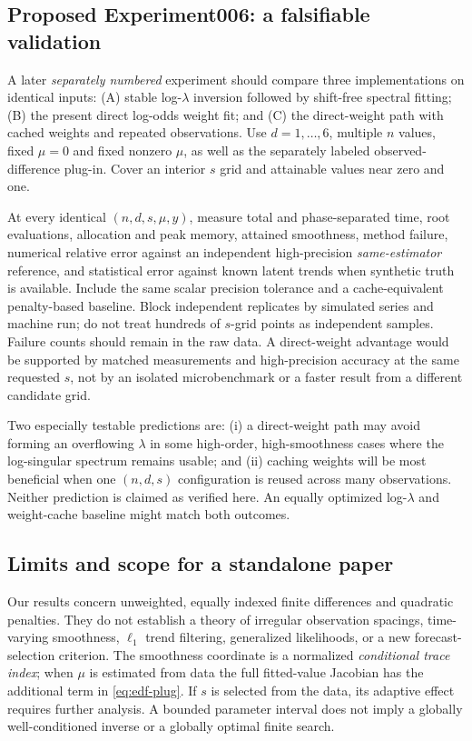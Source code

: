 \subsection{Proposed Experiment006: a falsifiable validation}
A later \emph{separately numbered} experiment should
compare three implementations on identical inputs:
(A) stable log-$\lambda$ inversion followed by
shift-free spectral fitting; (B) the present direct
log-odds weight fit; and (C) the direct-weight path
with cached weights and repeated observations.
Use $d=1,\ldots,6$, multiple $n$ values,
fixed $\mu=0$ and fixed nonzero $\mu$, as well
as the separately labeled observed-difference
plug-in. Cover an interior $s$ grid and attainable
values near zero and one.

At every identical $(n,d,s,\mu,y)$,
measure total and phase-separated time, root
evaluations, allocation and peak memory,
attained smoothness, method failure, numerical
relative error against an independent
high-precision \emph{same-estimator} reference,
and statistical error against known latent trends
when synthetic truth is available. Include the
same scalar precision tolerance and a
cache-equivalent penalty-based baseline.
Block independent replicates by simulated
series and machine run; do not treat hundreds
of $s$-grid points as independent samples.
Failure counts should remain in the raw data.
A direct-weight advantage would be supported by
matched measurements and high-precision accuracy
at the same requested $s$, not by an isolated
microbenchmark or a faster result from a
different candidate grid.

Two especially testable predictions are:
(i) a direct-weight path may avoid forming an
overflowing $\lambda$ in some high-order,
high-smoothness cases where the log-singular
spectrum remains usable; and (ii) caching weights
will be most beneficial when one $(n,d,s)$
configuration is reused across many observations.
Neither prediction is claimed as verified here.
An equally optimized log-$\lambda$ and weight-cache
baseline might match both outcomes.

\subsection{Limits and scope for a standalone paper}
Our results concern unweighted, equally indexed
finite differences and quadratic penalties.
They do not establish a theory of irregular
observation spacings, time-varying smoothness,
$\ell_1$ trend filtering, generalized likelihoods,
or a new forecast-selection criterion.
The smoothness coordinate is a normalized
\emph{conditional trace index}; when $\mu$
is estimated from data the full fitted-value
Jacobian has the additional term in
\eqref{eq:edf-plug}. If $s$ is selected from
the data, its adaptive effect requires
further analysis. A bounded parameter interval
does not imply a globally well-conditioned
inverse or a globally optimal finite search.

